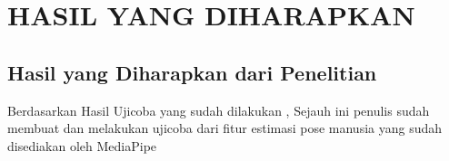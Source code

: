 \section{HASIL YANG DIHARAPKAN}

\subsection{Hasil yang Diharapkan dari Penelitian}

Berdasarkan Hasil Ujicoba yang sudah dilakukan , Sejauh ini penulis sudah membuat dan melakukan ujicoba dari fitur estimasi pose manusia yang sudah disediakan oleh MediaPipe
